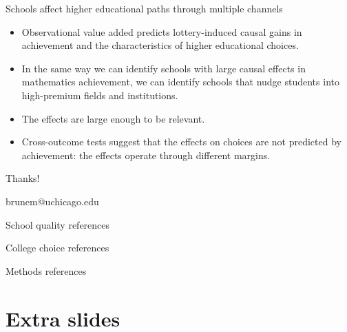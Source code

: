 \documentclass[11pt,aspectratio=169]{beamer}
\newenvironment{wideitemize}{%
  \begin{minipage}{0.92\textwidth}
  \begin{itemize}
  \addtolength{\itemsep}{0.75em}
}{%
  \end{itemize}
  \end{minipage}
}
\begin{document}
\begin{frame}{Schools affect higher educational paths through multiple channels}
\begin{wideitemize}
  \item Observational value added predicts lottery-induced causal gains in achievement and the characteristics of higher educational choices.

  \item In the same way we can identify schools with large causal effects in mathematics achievement, we can identify schools that nudge students into high-premium fields and institutions.

  \item The effects are large enough to be relevant. 

  \item Cross-outcome tests suggest that the effects on choices are not predicted by achievement: the effects operate through different margins.
\end{wideitemize}

\end{frame}

\begin{frame}[standout]
Thanks!

\vspace{0.8em}
\normalsize
brunem@uchicago.edu
\end{frame}

\begin{frame}{School quality references}
\printbibliography[heading=none,category=schoolquality]
\end{frame}

\begin{frame}{College choice references}
\printbibliography[heading=none,category=collegechoice]
\end{frame}

\begin{frame}{Methods references}
\printbibliography[heading=none,category=assignmentmethods]
\end{frame}




\appendix
\section{Extra slides}
\end{document}
